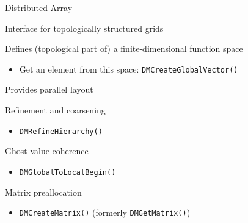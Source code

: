 \begin{frame}[fragile]{Distributed Array}

  \begin{block}{Interface for topologically structured grids}
  \end{block}

  \begin{block}{Defines (topological part of) a finite-dimensional function space}
    \begin{itemize} 
      \item Get an element from this space: \lstinline|DMCreateGlobalVector()| 
    \end{itemize}
  \end{block}

  \begin{block}{Provides parallel layout}
  \end{block}

  \begin{block}{Refinement and coarsening}
    \begin{itemize}
      \item \lstinline|DMRefineHierarchy()| 
    \end{itemize}
  \end{block}

  \begin{block}{Ghost value coherence}
    \begin{itemize}
       \item \lstinline|DMGlobalToLocalBegin()|
     \end{itemize}
  \end{block}

  \begin{block}{Matrix preallocation}
       \begin{itemize}
         \item \lstinline|DMCreateMatrix()| (formerly \lstinline|DMGetMatrix()|) 
       \end{itemize}
  \end{block}
\end{frame}

